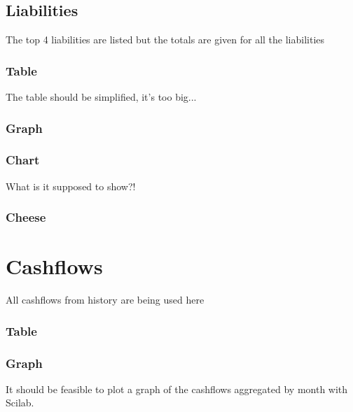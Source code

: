 \documentclass[8pt]{article} %
\begin{document}
\subsection{Liabilities}
The top 4 liabilities are listed but the totals are given for all the liabilities\\

\subsubsection{Table}


The table should be simplified, it's too big...\\
\subsubsection{Graph}


\subsubsection{Chart}
What is it supposed to show?!\\
\subsubsection{Cheese}



\section{Cashflows}


All cashflows from history are being used here\\

\subsubsection{Table}


\subsubsection{Graph}
%
It should be feasible to plot a graph of the cashflows aggregated by month with Scilab.
\end{document}
